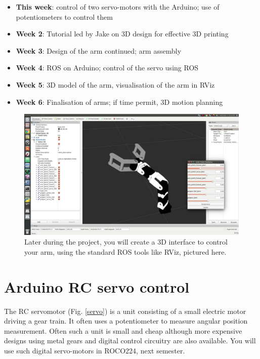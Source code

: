 \documentclass{instructions}
\begin{document}
\begin{itemize}
    \item \textbf{This week}:  control of two servo-motors with the Arduino; use of 
        potentiometers to control them
    \item \textbf{Week 2}: Tutorial led by Jake on 3D design for effective 3D printing
    \item \textbf{Week 3}: Design of the arm continued; arm assembly
    \item \textbf{Week 4}: ROS on Arduino; control of the servo using ROS
    \item \textbf{Week 5}: 3D model of the arm, visualisation of the arm in RViz
    \item \textbf{Week 6}: Finalisation of arms; if time permit, 3D motion
        planning
\end{itemize}


\begin{figure}[h!]
    \centering
    \includegraphics[width=0.9\linewidth]{servo-rviz}
    \caption{Later during the project, you will create a 3D interface to control
    your arm, using the standard ROS tools like RViz, pictured here.}
    \label{}
\end{figure}

\part{Arduino RC servo control}

The RC servomotor (Fig. \ref{servo}) is a unit consisting of a small electric
motor driving a gear train. It often uses a potentiometer to measure
angular position measurement. Often such a unit is small and cheap
although more expensive designs using metal gears and digital control
circuitry are also available. You will use such digital servo-motors in ROCO224,
next semester.
\end{document}

